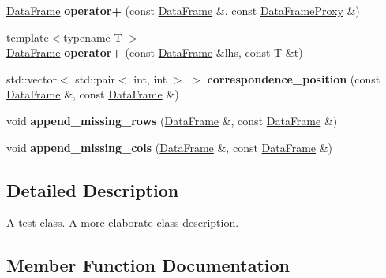 \begin{DoxyCompactItemize}
\item 
\mbox{\label{classDataFrame_a32fc0676af70bd35bf83e11c9ab946fc}} 
\hyperlink{classDataFrame}{Data\+Frame} {\bfseries operator+} (const \hyperlink{classDataFrame}{Data\+Frame} \&, const \hyperlink{classDataFrame_1_1DataFrameProxy}{Data\+Frame\+Proxy} \&)
\item 
\mbox{\label{classDataFrame_af0bd28935e605ba646d407b02e0a5850}} 
{\footnotesize template$<$typename T $>$ }\\\hyperlink{classDataFrame}{Data\+Frame} {\bfseries operator+} (const \hyperlink{classDataFrame}{Data\+Frame} \&lhs, const T \&t)
\item 
\mbox{\label{classDataFrame_a425d7127fe7def6529cd4e6a6c1ec11f}} 
std\+::vector$<$ std\+::pair$<$ int, int $>$ $>$ {\bfseries correspondence\+\_\+position} (const \hyperlink{classDataFrame}{Data\+Frame} \&, const \hyperlink{classDataFrame}{Data\+Frame} \&)
\item 
\mbox{\label{classDataFrame_a221d3063f94569b545fe4c3ae56597e8}} 
void {\bfseries append\+\_\+missing\+\_\+rows} (\hyperlink{classDataFrame}{Data\+Frame} \&, const \hyperlink{classDataFrame}{Data\+Frame} \&)
\item 
\mbox{\label{classDataFrame_a27cc8acd51a5cd40e6a2726368914661}} 
void {\bfseries append\+\_\+missing\+\_\+cols} (\hyperlink{classDataFrame}{Data\+Frame} \&, const \hyperlink{classDataFrame}{Data\+Frame} \&)
\end{DoxyCompactItemize}


\subsection{Detailed Description}
A test class. A more elaborate class description. 

\subsection{Member Function Documentation}
\mbox{\label{classDataFrame_a5909652f24e66c22922b4b4c910f2b09}} 
